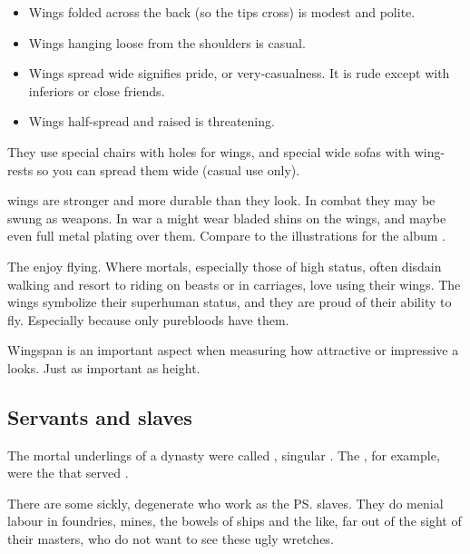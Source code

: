 \begin{itemize}
  \item 
    Wings folded across the back (so the tips cross) is modest and polite. 
  \item 
    Wings hanging loose from the shoulders is casual. 
  \item 
    Wings spread wide signifies pride, or very-casualness. 
    It is rude except with inferiors or close friends. 
  \item 
    Wings half-spread and raised is threatening. 
\end{itemize}

They use special chairs with holes for wings, and special wide sofas with wing-rests so you can spread them wide (casual use only). 

\Resphan{} wings are stronger and more durable than they look. 
In combat they may be swung as weapons. 
In war a \resphan{} might wear bladed shins on the wings, and maybe even full metal plating over them. 
Compare to the illustrations for the album . 

The \resphain{} enjoy flying. 
Where mortals, especially those of high status, often disdain walking and resort to riding on beasts or in carriages, \resphain{} love using their wings. 
The wings symbolize their superhuman status, and they are proud of their ability to fly. 
Especially because only purebloods have them. 

Wingspan is an important aspect when measuring how attractive or impressive a \resphan{} looks. 
Just as important as height. 









\subsection{Servants and slaves}
The mortal underlings of a \resphan dynasty were called \hedrim, singular \hedor. 
The \hedrim[\Mystraacht], for example, were the \hedrim that served \Mystraacht. 

There are some sickly, degenerate \humans{} who work as the \ps{\resphain}{} slaves. 
They do menial labour in foundries, mines, the bowels of ships and the like, far out of the sight of their masters, who do not want to see these ugly wretches. 

